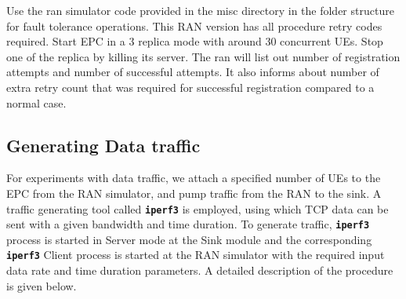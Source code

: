 \pdfminorversion=4\documentclass[hidelinks]{report}
\newcommand{\cf}[1] {
	\textbf{\texttt{#1}}
}
\begin{document}
Use the ran simulator code provided in the misc directory in the folder structure for fault tolerance operations. This RAN version has all procedure retry codes required. Start EPC in a 3 replica mode with around 30 concurrent UEs. Stop one of the replica by killing its server. The ran will list out number of registration attempts and number of successful attempts. It also informs about number of extra retry count that was required for successful registration compared to a normal case.


\subsection*{Generating Data traffic}

For experiments with data traffic, we attach a specified number of UEs to the EPC from the RAN simulator, and pump traffic from the RAN to the sink. A traffic generating tool called \cf{iperf3} is employed, using which TCP data can be sent with a given bandwidth and time duration. To generate traffic, \cf{iperf3} process is started in Server mode at the Sink module and the corresponding \cf{iperf3} Client process is started at the RAN simulator with the required input data rate and time duration parameters. A detailed description of the procedure is given below.
\end{document}
